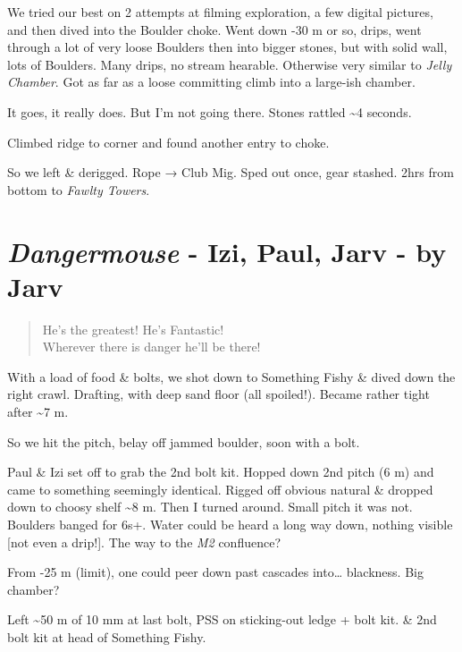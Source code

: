We tried our best on 2 attempts at filming exploration, a few digital
pictures, and then dived into the Boulder choke. Went down -30 m or so,
drips, went through a lot of very loose Boulders then into bigger
stones, but with solid wall, lots of Boulders. Many drips, no stream
hearable. Otherwise very similar to \emph{Jelly Chamber}. Got as far as
a loose committing climb into a large-ish chamber.

It goes, it really does. But I'm not going there. Stones rattled
\textasciitilde 4 seconds.

Climbed ridge to corner and found another entry to choke.

So we left \& derigged. Rope → Club Mig. Sped out once, gear stashed.
2hrs from bottom to \emph{Fawlty Towers}.


\hypertarget{dangermouse---izi-paul-jarv---by-jarv}{%
\section{\texorpdfstring{\emph{Dangermouse} - Izi, Paul, Jarv - by
Jarv}{Dangermouse - Izi, Paul, Jarv - by Jarv}}\label{dangermouse---izi-paul-jarv---by-jarv}}

\begin{verse}
He's the greatest! He's Fantastic!\\
Wherever there is danger he'll be there!
\end{verse}

With a load of food \& bolts, we shot down to Something Fishy \& dived
down the right crawl. Drafting, with deep sand floor (all spoiled!).
Became rather tight after \textasciitilde7 m.

So we hit the pitch, belay off jammed boulder, soon with a bolt.

Paul \& Izi set off to grab the 2nd bolt kit. Hopped down 2nd pitch (6
m) and came to something seemingly identical. Rigged off obvious natural
\& dropped down to choosy shelf \textasciitilde8 m. Then I turned
around. Small pitch it was not. Boulders banged for 6s+. Water could be
heard a long way down, nothing visible {[}not even a drip!{]}. The way
to the \emph{M2} confluence?

From -25 m (limit), one could peer down past cascades into\ldots{}
blackness. Big chamber?

Left \textasciitilde50 m of 10 mm at last bolt, PSS on sticking-out
ledge + bolt kit. \& 2nd bolt kit at head of Something Fishy.

